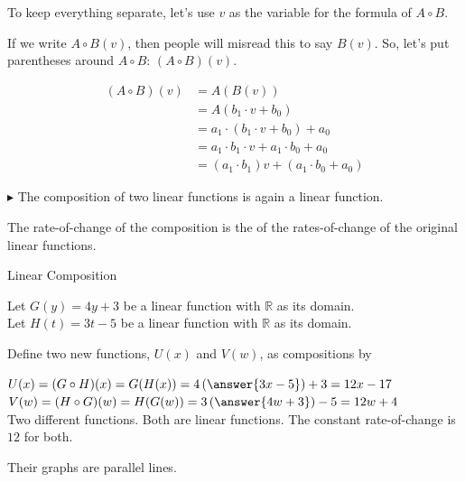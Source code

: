 \documentclass{ximera}
\begin{document}
To keep everything separate, let's use $v$ as the variable for the formula of $A \circ B$.



\begin{notation}
If we write $A \circ B(v)$, then people will misread this to say $B(v)$.  So, let's put parentheses around $A \circ B$: $(A \circ B)(v)$.
\end{notation}






\begin{align*}
(A \circ B)(v) & = A(B(v)) \\
& = A(b_1 \cdot v + b_0)  \\
& = a_1 \cdot (b_1 \cdot v + b_0) + a_0  \\
& = a_1 \cdot b_1 \cdot v + a_1 \cdot b_0 + a_0    \\
& = (a_1 \cdot b_1) v + (a_1 \cdot b_0 + a_0)
\end{align*}






$\blacktriangleright$ The composition of two linear functions is again a linear function.


\begin{observation}
The rate-of-change of the composition is the  of the rates-of-change of the original linear functions.
\end{observation}




\begin{example} Linear Composition

Let $G(y) = 4 y + 3$ be a linear function with $\mathbb{R}$ as its domain. \\
Let $H(t) = 3 t -5$ be a linear function with $\mathbb{R}$ as its domain. 


Define two new functions, $U(x)$ and $V(w)$, as compositions by

$U(x) = (G \circ H)(x) = G(H(x)) = 4 \left(\answer{3 x - 5}\right) + 3 = 12 x -17$ \\
$V(w) = (H \circ G)(w) =H(G(w)) = 3 \left(\answer{4 w + 3}\right) - 5 = 12 w + 4$ \\


Two different functions. Both are linear functions. The constant rate-of-change is $12$ for both. 

Their graphs are parallel lines. 


\end{example}
\end{document}
